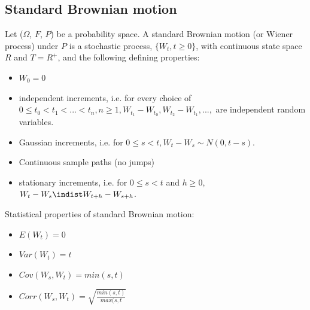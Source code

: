 \documentclass[11pt,a4paper]{book}
\theoremstyle{definition}\newtheorem{definition}{Definition}
\theoremstyle{definition}\newtheorem{fact}{Fact}
\theoremstyle{definition}\newtheorem{remark}{Remark}
\theoremstyle{definition}\newtheorem{ex}{Ex.}
\theoremstyle{definition}\newtheorem{project}{Project}
\theoremstyle{definition}\newtheorem{problem}{Problem}
\theoremstyle{definition}\newtheorem{example}{Example}
\numberwithin{theorem}{section}
\numberwithin{corollary}{chapter}
\numberwithin{assumption}{chapter}
\numberwithin{definition}{chapter}
\numberwithin{prop}{chapter}
\numberwithin{notation}{chapter}
\numberwithin{problem}{chapter}
\numberwithin{example}{chapter}
\numberwithin{fact}{chapter}
\numberwithin{ex}{chapter}
\begin{document}
\subsection{Standard Brownian motion}
Let ($\Omega$, $F$, $P$) be a probability space. A standard Brownian motion (or Wiener process) under $P$ is a stochastic process, $\{W_t, t \geq 0 \}$, with continuous state space $R$ and $T = R^{+}$, and the following defining properties:
\begin{itemize}
\item $W_0 = 0$
\item independent increments, i.e. for every choice of $0 \leq t_0 < t_1 < ... < t_n, n \geq 1, W_{t_1} - W_{t_0}, W_{t_2} - W_{t_1}, ...,$ are independent random variables.
\item Gaussian increments, i.e. for $0 \leq s < t, W_t - W_s \sim N(0, t-s)$.
\item Continuous sample paths (no jumps)
\item stationary increments, i.e. for $0 \leq s < t$ and $h \geq 0$, $W_t - W_s \indist W_{t+h} - W_{s+h} $.
\end{itemize}

Statistical properties of standard Brownian motion:
\begin{itemize}
\item $E(W_t) = 0$
\item $Var(W_t) = t$
\item $Cov(W_s, W_t) = min(s,t)$
\item $Corr(W_s, W_t) = \sqrt{\frac{min(s,t)}{max(s,t}}$
\end{itemize}
\end{document}
